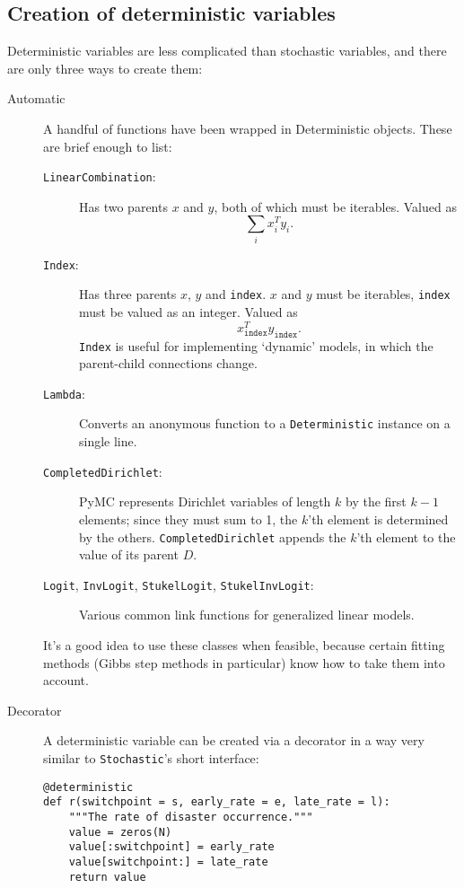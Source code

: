\subsection*{Creation of deterministic variables}
Deterministic variables are less complicated than stochastic variables, and there are only three ways to create them:
\begin{description}
   \item[Automatic] A handful of functions have been wrapped in Deterministic objects. These are brief enough to list:
   \begin{description}
      \item[\texttt{LinearCombination}:] Has two parents $x$ and $y$, both of which must be iterables. Valued as
      \[
      \sum_i x_i^T y_i.
      \]
      \item[\texttt{Index}:] Has three parents $x$, $y$ and \texttt{index}. $x$ and $y$ must be iterables, \texttt{index} must be valued as an integer. Valued as
      \[
      x_{\mathtt{index}}^T y_{\mathtt{index}}.
      \]
      \texttt{Index} is useful for implementing `dynamic' models, in which the parent-child connections change.
      \item[\texttt{Lambda}:] Converts an anonymous function to a \texttt{Deterministic} instance on a single line.
      \item[\texttt{CompletedDirichlet}:] PyMC represents Dirichlet variables of length $k$ by the first $k-1$ elements; since they must sum to 1, the $k$'th element is determined by the others. \texttt{CompletedDirichlet} appends the $k$'th element to the value of its parent $D$.      
      \item[\texttt{Logit}, \texttt{InvLogit}, \texttt{StukelLogit}, \texttt{StukelInvLogit}:] Various common link functions for generalized linear models.
   \end{description}
   It's a good idea to use these classes when feasible, because certain fitting methods (Gibbs step methods in particular) know how to take them into account.
    \item[Decorator] A deterministic variable can be created via a decorator in a way very similar to \texttt{Stochastic}'s short interface:
\begin{verbatim}
@deterministic
def r(switchpoint = s, early_rate = e, late_rate = l):
    """The rate of disaster occurrence."""
    value = zeros(N)
    value[:switchpoint] = early_rate
    value[switchpoint:] = late_rate
    return value
\end{verbatim}

\end{description}
